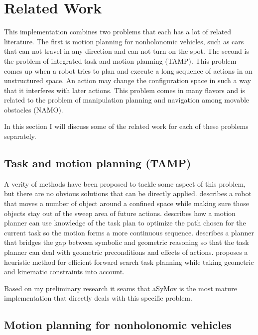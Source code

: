 \documentclass[letterpaper, 10 pt, conference]{ieeeconf}  %
\begin{document}
\label{related_work}
\section{Related Work}

This implementation combines two problems that each has a lot of related literature. The first is motion planning for nonholonomic vehicles, such as cars that can not travel in any direction and can not turn on the spot. The second is the problem of integrated task and motion planning (TAMP). This problem comes up when a robot tries to plan and execute a long sequence of actions in an unstructured space. An action may change the configuration space in such a way that it interferes with later actions. This problem comes in many flavors and is related to the problem of manipulation planning and navigation among movable obstacles (NAMO). 

In this section I will discuss some of the related work for each of these problems separately.

\subsection{Task and motion planning (TAMP)}

A verity of methods have been proposed to tackle some aspect of this problem, but there are no obvious solutions that can be directly applied. 
\cite{hpn2} describes a robot that moves a number of object around a confined space while making sure those objects stay out of the sweep area of future actions. \cite{waipointSequence} describes how a motion planner can use knowledge of the task plan to optimize the path chosen for the current task so the motion forms a more continuous sequence. \cite{asymov} describes a planner that bridges the gap between symbolic and geometric reasoning so that the task planner can deal with geometric preconditions and effects of actions. \cite{ffrob} proposes a heuristic method for efficient forward search task planning while taking geometric and kinematic constraints into account.

Based on my preliminary research it seams that aSyMov\cite{asymov}\cite{asymov2} is the most mature implementation that directly deals with this specific problem. 


\subsection{Motion planning for nonholonomic vehicles}
\end{document}
